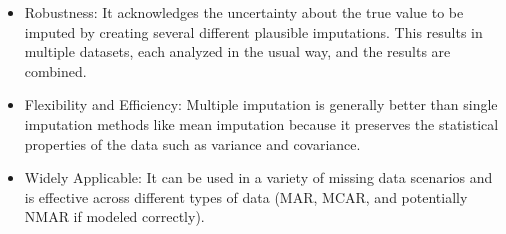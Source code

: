\documentclass[12pt]{article}
\begin{document}
\begin{enumerate}
\begin{itemize}
\item Robustness: It acknowledges the uncertainty about the true value to be imputed by creating several different plausible imputations. This results in multiple datasets, each analyzed in the usual way, and the results are combined.
\item Flexibility and Efficiency: Multiple imputation is generally better than single imputation methods like mean imputation because it preserves the statistical properties of the data such as variance and covariance.
\item Widely Applicable: It can be used in a variety of missing data scenarios and is effective across different types of data (MAR, MCAR, and potentially NMAR if modeled correctly).
\end{itemize}


\end{enumerate}
%
%
%
%
%
%
%
%
%
%
\end{document}
